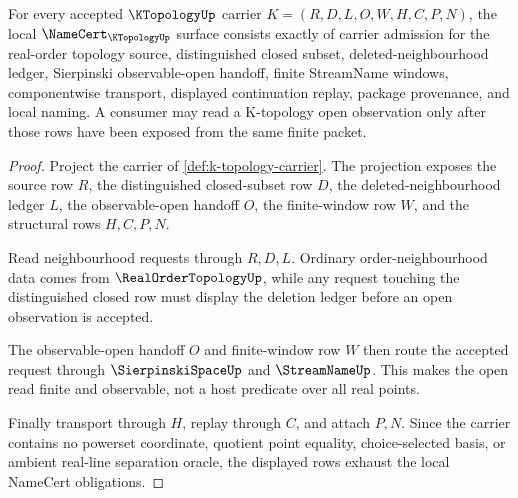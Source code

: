 \begin{theorem}
\label{thm:k-topology-namecert-obligations}
For every accepted $\KTopologyUp$ carrier $K=(R,D,L,O,W,H,C,P,N)$, the local $\NameCert_{\KTopologyUp}$ surface consists exactly of carrier admission for the real-order topology source, distinguished closed subset, deleted-neighbourhood ledger, Sierpinski observable-open handoff, finite StreamName windows, componentwise transport, displayed continuation replay, package provenance, and local naming. A consumer may read a K-topology open observation only after those rows have been exposed from the same finite packet.
\end{theorem}
\begin{proof}
Project the carrier of \autoref{def:k-topology-carrier}. The projection exposes the source row $R$, the distinguished closed-subset row $D$, the deleted-neighbourhood ledger $L$, the observable-open handoff $O$, the finite-window row $W$, and the structural rows $H,C,P,N$.

Read neighbourhood requests through $R,D,L$. Ordinary order-neighbourhood data comes from $\RealOrderTopologyUp$, while any request touching the distinguished closed row must display the deletion ledger before an open observation is accepted.

The observable-open handoff $O$ and finite-window row $W$ then route the accepted request through $\SierpinskiSpaceUp$ and $\StreamNameUp$. This makes the open read finite and observable, not a host predicate over all real points.

Finally transport through $H$, replay through $C$, and attach $P,N$. Since the carrier contains no powerset coordinate, quotient point equality, choice-selected basis, or ambient real-line separation oracle, the displayed rows exhaust the local NameCert obligations.
\end{proof}



